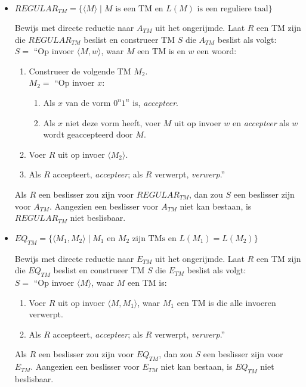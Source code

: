 \documentclass[]{article}
\begin{document}
\begin{itemize}
	
	\item $REGULAR_{TM} = \{ \langle M \rangle \mid M \mbox{ is een TM en $L(M)$ is een reguliere taal} \}$

	Bewijs met directe reductie naar $A_{TM}$ uit het ongerijmde.
	Laat $R$ een TM zijn die $REGULAR_{TM}$ beslist en construeer TM $S$ die $A_{TM}$ beslist als volgt: \\
	$S = $ ``Op invoer $\langle M, w \rangle$, waar $M$ een TM is en $w$ een woord:
	\begin{enumerate}
		\item Construeer de volgende TM $M_2$. \\
		$M_2 = $ ``Op invoer $x$:
		\begin{enumerate}[1.]
			\item Als $x$ van de vorm $0^n1^n$ is, \emph{accepteer}.
			\item Als $x$ niet deze vorm heeft, voer $M$ uit op invoer $w$ en \emph{accepteer} als $w$ wordt geaccepteerd door $M$. 
		\end{enumerate}
		\item Voer $R$ uit op invoer $\langle M_2 \rangle$.
		\item Als $R$ accepteert, \emph{accepteer}; als $R$ verwerpt, \emph{verwerp}.''
	\end{enumerate}
	Als $R$ een beslisser zou zijn voor $REGULAR_{TM}$, dan zou $S$ een beslisser zijn voor $A_{TM}$. Aangezien een beslisser voor $A_{TM}$ niet kan bestaan, is $REGULAR_{TM}$ niet beslisbaar.
		
	
	\item $EQ_{TM} = \{ \langle M_1, M_2 \rangle \mid \mbox{$M_1$ en $M_2$ zijn TMs en } L(M_1) = L(M_2) \}$
	
	Bewijs met directe reductie naar $E_{TM}$ uit het ongerijmde.
	Laat $R$ een TM zijn die $EQ_{TM}$ beslist en construeer TM $S$	 die $E_{TM}$ beslist als volgt: \\
	$S = $ ``Op invoer $\langle M \rangle$, waar $M$ een TM is:
	\begin{enumerate}
		\item Voer $R$ uit op invoer $\langle M, M_1 \rangle$, waar $M_1$ een TM is die alle invoeren verwerpt.
		\item Als $R$ accepteert, \emph{accepteer}; als $R$ verwerpt, \emph{verwerp}.''
	\end{enumerate}
	Als $R$ een beslisser zou zijn voor $EQ_{TM}$, dan zou $S$ een beslisser zijn voor $E_{TM}$. Aangezien een beslisser voor $E_{TM}$ niet kan bestaan, is $EQ_{TM}$ niet beslisbaar.
	

\end{itemize}
\end{document}
